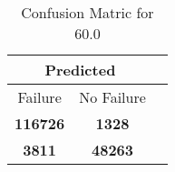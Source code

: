 \begin{table}[] 
\caption{Confusion Matric for 60.0} 
\label{Table: Prediction Accuracy-DMD60.0OnlySunEKF-combinationReflectionEKF-top2perfectNoFailurePrediction-Reflection} 
\centering 
\begin{tabular} 
 {@{}ccc@{}} 
\toprule 
\multicolumn{2}{c}{\textbf{Predicted}}
 \\ \midrule 
\multicolumn{1}{|c|}{Failure} & 
\multicolumn{1}{c|}{No Failure}
 \\ \midrule 
\multicolumn{1}{|c|}{\color{green}\textbf{116726}} & 
\multicolumn{1}{c|}{\color{red}\textbf{1328}}
 \\ \midrule 
\multicolumn{1}{|c|}{\color{red}\textbf{3811}} & 
\multicolumn{1}{c|}{\color{green}\textbf{48263}}
 \\ \bottomrule 
\end{tabular} 
\end{table} 
